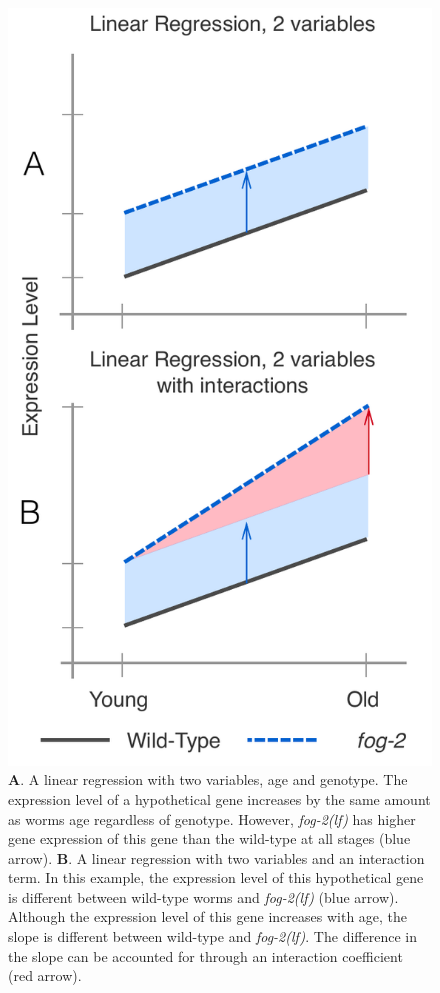 \documentclass[9pt,twocolumn,twoside]{gsag3jnl}
\newcommand{\fog}{\emph{\mbox{fog-2(lf)}}}
\begin{document}
\begin{figure}[htbp]
\renewcommand{\familydefault}{\sfdefault}\normalfont{}
\centering
\includegraphics[width=\linewidth]{../../output/figs/final_figs/linear_regression.pdf}
\caption{
\textbf{A}. A linear regression with two variables, age and genotype.
The expression level of a hypothetical gene increases by the same amount as worms
age regardless of genotype. However, \fog{} has higher gene expression of this
gene than the wild-type at all stages (blue arrow).
\textbf{B}. A linear regression with two variables and an
interaction term. In this example, the expression level of this hypothetical
gene is different between wild-type worms and \fog{} (blue arrow). Although the
expression level of this gene increases with age, the slope is different between
wild-type and \fog{}. The difference in the slope can be accounted for through
an interaction coefficient (red arrow).
}
\label{fig:linear_reg}
\end{figure}
\end{document}
